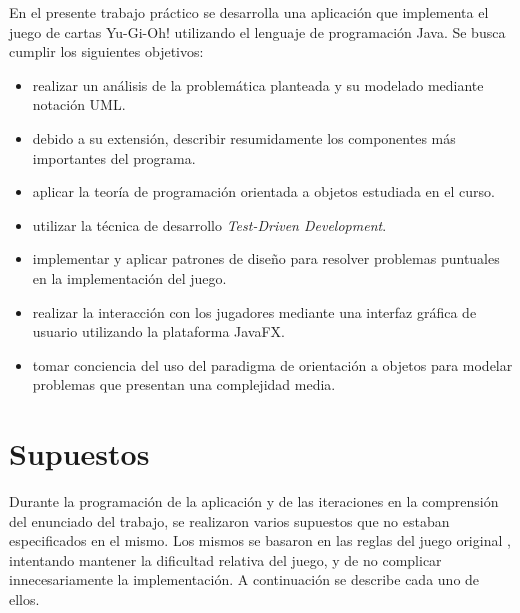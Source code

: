 	En el presente trabajo práctico se desarrolla una aplicación que implementa el juego de cartas Yu-Gi-Oh! utilizando el lenguaje de programación Java. Se busca cumplir los siguientes objetivos:
	\begin{itemize}
		\item realizar un análisis de la problemática planteada y su modelado mediante notación UML.
		\item debido a su extensión, describir resumidamente los componentes más importantes del programa.
		\item aplicar la teoría de programación orientada a objetos estudiada en el curso.
		\item utilizar la técnica de desarrollo \emph{Test-Driven Development}.
		\item implementar y aplicar patrones de diseño para resolver problemas puntuales en la implementación del juego.
		\item realizar la interacción con los jugadores mediante una interfaz gráfica de usuario utilizando la plataforma JavaFX.
		\item tomar conciencia del uso del paradigma de orientación a objetos para modelar problemas que presentan una complejidad media.
	\end{itemize}
	
	\section{Supuestos}
	
	Durante la programación de la aplicación y de las iteraciones en la comprensión del enunciado del trabajo, se realizaron varios supuestos que no estaban especificados en el mismo. Los mismos se basaron en las reglas del juego original \cite{reglas_juego}, intentando mantener la dificultad relativa del juego, y de no complicar innecesariamente la implementación. A continuación se describe cada uno de ellos.
	
